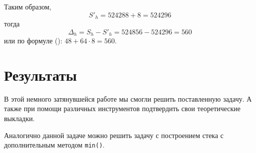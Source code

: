 Таким образом, 
\begin{dmath*}
  S'_h = 524288 + 8 = 524296 
\end{dmath*}
тогда
\begin{dmath*}
  \Delta_h = S_h - S'_h = 524856 - 524296  = 560 
\end{dmath*}
или по формуле (): \(48 + 64\cdot 8 = 560\).


\section{Результаты}

В этой немного затянувшейся работе мы смогли решить поставленную задачу. А также при помощи различных инструментов подтвердить свои теоретические выкладки.

Аналогично данной задаче можно решить задачу с построением стека с дополнительным методом \texttt{min()}.